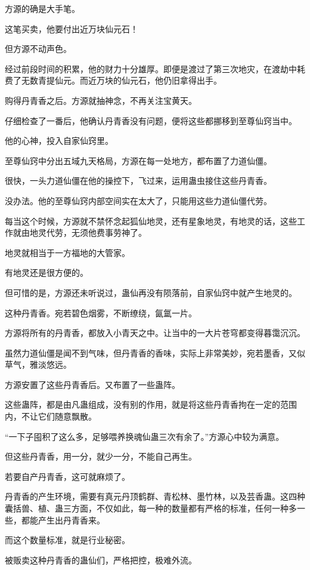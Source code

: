 \begin{this_body}
方源的确是大手笔。

这笔买卖，他要付出近万块仙元石！

但方源不动声色。

经过前段时间的积累，他的财力十分雄厚。即便是渡过了第三次地灾，在渡劫中耗费了无数青提仙元。而近万块的仙元石，他仍旧拿得出手。

购得丹青香之后。方源就抽神念，不再关注宝黄天。

仔细检查了一番后，他确认丹青香没有问题，便将这些都挪移到至尊仙窍当中。

他的心神，投入自家仙窍里。

至尊仙窍中分出五域九天格局，方源在每一处地方，都布置了力道仙僵。

很快，一头力道仙僵在他的操控下，飞过来，运用蛊虫接住这些丹青香。

没办法。他的至尊仙窍内部空间实在太大了，只能用这些力道仙僵代劳。

每当这个时候，方源就不禁怀念起狐仙地灵，还有星象地灵，有地灵的话，这些工作就由地灵代劳，无须他费事劳神了。

地灵就相当于一方福地的大管家。

有地灵还是很方便的。

但可惜的是，方源还未听说过，蛊仙再没有陨落前，自家仙窍中就产生地灵的。

这种丹青香。宛若碧色烟雾，不断缭绕，氤氲一片。

方源将所有的丹青香，都放入小青天之中。让当中的一大片苍穹都变得暮霭沉沉。

虽然力道仙僵是闻不到气味，但丹青香的香味，实际上非常美妙，宛若墨香，又似草气，雅淡悠远。

方源安置了这些丹青香后。又布置了一些蛊阵。

这些蛊阵，都是由凡蛊组成，没有别的作用，就是将这些丹青香拘在一定的范围内，不让它们随意飘散。

“一下子囤积了这么多，足够喂养换魂仙蛊三次有余了。”方源心中较为满意。

但这些丹青香，用一分，就少一分，不能自己再生。

若要自产丹青香，这可就麻烦了。

丹青香的产生环境，需要有真元丹顶鹤群、青松林、墨竹林，以及芸香蛊。这四种囊括兽、植、蛊三方面，不仅如此，每一种的数量都有严格的标准，任何一种多一些，都能产生出丹青香来。

而这个数量标准，就是行业秘密。

被贩卖这种丹青香的蛊仙们，严格把控，极难外流。


\end{this_body}
